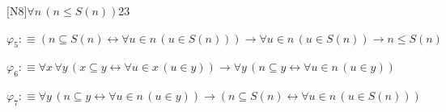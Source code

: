 \begin{fullproof}{[N8]}{$\forall n\,(n \leq S(n))$}{23}
\begin{abbrevlist}
\item $\varphi_{5} :\equiv (n \subseteq S(n) \leftrightarrow \forall u \in n\,(u \in S(n))) \to \forall u \in n\,(u \in S(n)) \to n \leq S(n)$
\item $\varphi_{6} :\equiv \forall x\,\forall y\,(x \subseteq y \leftrightarrow \forall u \in x\,(u \in y)) \to \forall y\,(n \subseteq y \leftrightarrow \forall u \in n\,(u \in y))$
\item $\varphi_{7} :\equiv \forall y\,(n \subseteq y \leftrightarrow \forall u \in n\,(u \in y)) \to (n \subseteq S(n) \leftrightarrow \forall u \in n\,(u \in S(n)))$
\end{abbrevlist}
\end{fullproof}
